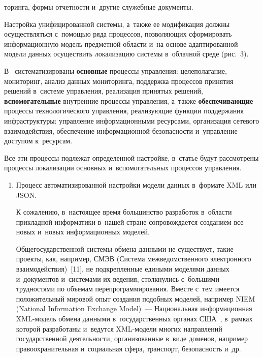 \begin{multicols}{2}

\noindent
торинга, формы отчетности и~другие 
служебные до\-ку\-менты.
 
    
    Настройка унифицированной сис\-те\-мы, а~также ее модификация должны 
осуществляться с~по\-мощью ряда процессов, позволяющих сформировать 
информационную модель предметной об\-ласти и~на основе адаптированной 
модели данных осуществить локализацию сис\-те\-мы в~облачной среде (рис.~3).
    
    В~\cite{8-zac} систематизированы \textbf{основные} процессы 
управления: целеполагание, мониторинг, анализ данных мониторинга, 
поддержка процессов принятия решений в~сис\-те\-ме управ\-ле\-ния, реализация 
принятых решений, \textbf{вспомогательные} внут\-рен\-ние процессы 
управ\-ле\-ния, а~также \textbf{обеспечивающие} процессы технологического 
управ\-ле\-ния, реа\-ли\-зу\-ющие функции поддержания инфраструктуры: 
управ\-ле\-ние информационными ресурсами, организация сетевого 
взаимодействия, обеспечение информационной без\-опас\-ности и~управ\-ле\-ние 
доступом к~ресурсам. 

Все эти процессы подлежат определенной настройке, 
в~статье будут рас\-смот\-ре\-ны процессы локализации основных 
и~вспомогательных процессов управ\-ле\-ния.
  \begin{enumerate}[1.]  
\item 
Процесс автоматизированной настройки модели данных в~формате 
XML или JSON. 
    
    К сожалению, в~настоящее время большинство разработок в~об\-ласти 
при\-клад\-ной информатики в~нашей стране сопровождается со\-зда\-ни\-ем все 
новых и~новых информационных мо\-де\-лей. 
{

}

Общегосударственной сис\-те\-мы 
обмена дан\-ны\-ми не существует, такие проекты, как, на\-пример, СМЭВ
(Система межведомственного электронного взаимодействия)~[11], 
не подкрепленные едиными моделями данных и~документов и~сис\-те\-ма\-ми их 
ведения, столкнулись с~большими трудностями по объемам 
перепрограммирования. Вместе с~тем  имеется положительный мировой опыт 
создания подобных моделей, например NIEM  (National Information Exchange 
Model)~--- Национальная информационная XML-мо\-дель обмена данными 
в~государственных органах США~\cite{12-zac}, в~рамках которой разработаны 
и~ведутся XML-мо\-де\-ли многих на\-прав\-ле\-ний государственной 
дея\-тель\-ности, организованные в~виде доменов, например 
правоохранительная и~социальная сфера, транспорт, без\-опас\-ность и~др.
    


\end{enumerate}
\end{multicols}
